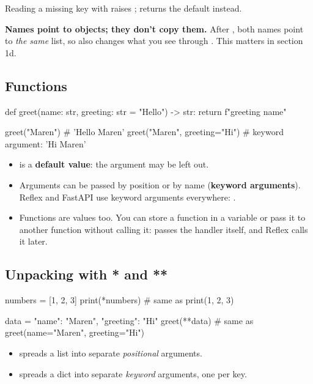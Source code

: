Reading a missing key with  raises ;  returns the default instead.

\textbf{Names point to objects; they don't copy them.} After , both names point to \emph{the same} list, so  also changes what you see through . This matters in section 1d.

\subsection{Functions}

\begin{py}
def greet(name: str, greeting: str = "Hello") -> str:
	return f"{greeting} {name}"

greet("Maren")                    # 'Hello Maren'
greet("Maren", greeting="Hi")     # keyword argument: 'Hi Maren'
\end{py}

\begin{itemize}
\item {} is a \textbf{default value}: the argument may be left out.
\item Arguments can be passed by position or by name (\textbf{keyword arguments}). Reflex and FastAPI use keyword arguments everywhere: .
\item Functions are values too. You can store a function in a variable or pass it to another function without calling it:  passes the handler itself, and Reflex calls it later.
\end{itemize}

\subsection{Unpacking with * and **}

\begin{py}
numbers = [1, 2, 3]
print(*numbers)            # same as print(1, 2, 3)

data = {"name": "Maren", "greeting": "Hi"}
greet(**data)              # same as greet(name="Maren", greeting="Hi")
\end{py}

\begin{itemize}
\item {} spreads a list into separate \emph{positional} arguments.
\item {} spreads a dict into separate \emph{keyword} arguments, one per key.
\end{itemize}

